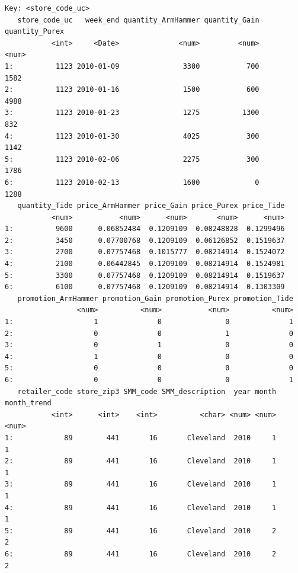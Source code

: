 \documentclass[
]{article}
\begin{document}
\begin{verbatim}
Key: <store_code_uc>
   store_code_uc   week_end quantity_ArmHammer quantity_Gain quantity_Purex
           <int>     <Date>              <num>         <num>          <num>
1:          1123 2010-01-09               3300           700           1582
2:          1123 2010-01-16               1500           600           4988
3:          1123 2010-01-23               1275          1300            832
4:          1123 2010-01-30               4025           300           1142
5:          1123 2010-02-06               2275           300           1786
6:          1123 2010-02-13               1600             0           1288
   quantity_Tide price_ArmHammer price_Gain price_Purex price_Tide
           <num>           <num>      <num>       <num>      <num>
1:          9600      0.06852484  0.1209109  0.08248828  0.1299496
2:          3450      0.07700768  0.1209109  0.06126852  0.1519637
3:          2700      0.07757468  0.1015777  0.08214914  0.1524072
4:          2100      0.06442845  0.1209109  0.08214914  0.1524981
5:          3300      0.07757468  0.1209109  0.08214914  0.1519637
6:          6100      0.07757468  0.1209109  0.08214914  0.1303309
   promotion_ArmHammer promotion_Gain promotion_Purex promotion_Tide
                 <num>          <num>           <num>          <num>
1:                   1              0               0              1
2:                   0              0               1              0
3:                   0              1               0              0
4:                   1              0               0              0
5:                   0              0               0              0
6:                   0              0               0              1
   retailer_code store_zip3 SMM_code SMM_description  year month month_trend
           <int>      <int>    <int>          <char> <num> <num>       <num>
1:            89        441       16       Cleveland  2010     1           1
2:            89        441       16       Cleveland  2010     1           1
3:            89        441       16       Cleveland  2010     1           1
4:            89        441       16       Cleveland  2010     1           1
5:            89        441       16       Cleveland  2010     2           2
6:            89        441       16       Cleveland  2010     2           2
\end{verbatim}
\end{document}
